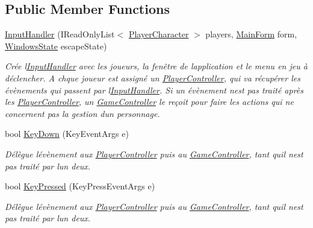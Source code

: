 \subsection*{Public Member Functions}
\begin{DoxyCompactItemize}
\item 
\hyperlink{class_tentacle_slicers_1_1inputs_1_1_input_handler_a7c9bfb4948b863cf8499d5142b622f32}{Input\+Handler} (I\+Read\+Only\+List$<$ \hyperlink{class_tentacle_slicers_1_1actors_1_1_player_character}{Player\+Character} $>$ players, \hyperlink{class_tentacle_slicers_1_1windows_1_1_main_form}{Main\+Form} form, \hyperlink{class_tentacle_slicers_1_1windows_1_1_windows_state}{Windows\+State} escape\+State)
\begin{DoxyCompactList}\small\item\em Crée l\textquotesingle{}\hyperlink{class_tentacle_slicers_1_1inputs_1_1_input_handler}{Input\+Handler} avec les joueurs, la fenêtre de l\textquotesingle{}application et le menu en jeu à déclencher. A chque joueur est assigné un \hyperlink{class_tentacle_slicers_1_1inputs_1_1_player_controller}{Player\+Controller}, qui va récupérer les évènements qui passent par l\textquotesingle{}\hyperlink{class_tentacle_slicers_1_1inputs_1_1_input_handler}{Input\+Handler}. Si un évènement n\textquotesingle{}est pas traité après les \hyperlink{class_tentacle_slicers_1_1inputs_1_1_player_controller}{Player\+Controller}, un \hyperlink{class_tentacle_slicers_1_1inputs_1_1_game_controller}{Game\+Controller} le reçoit pour faire les actions qui ne concernent pas la gestion d\textquotesingle{}un personnage. \end{DoxyCompactList}\item 
bool \hyperlink{class_tentacle_slicers_1_1inputs_1_1_input_handler_a3ac60dd0530cbd2b5e00d34d04f3ffc4}{Key\+Down} (Key\+Event\+Args e)
\begin{DoxyCompactList}\small\item\em Délègue l\textquotesingle{}évènement aux \hyperlink{class_tentacle_slicers_1_1inputs_1_1_player_controller}{Player\+Controller} puis au \hyperlink{class_tentacle_slicers_1_1inputs_1_1_game_controller}{Game\+Controller}, tant qu\textquotesingle{}il n\textquotesingle{}est pas traité par l\textquotesingle{}un d\textquotesingle{}eux. \end{DoxyCompactList}\item 
bool \hyperlink{class_tentacle_slicers_1_1inputs_1_1_input_handler_a45c9b57b11c327fbf21e7927fedac068}{Key\+Pressed} (Key\+Press\+Event\+Args e)
\begin{DoxyCompactList}\small\item\em Délègue l\textquotesingle{}évènement aux \hyperlink{class_tentacle_slicers_1_1inputs_1_1_player_controller}{Player\+Controller} puis au \hyperlink{class_tentacle_slicers_1_1inputs_1_1_game_controller}{Game\+Controller}, tant qu\textquotesingle{}il n\textquotesingle{}est pas traité par l\textquotesingle{}un d\textquotesingle{}eux. \end{DoxyCompactList}\item 

\end{DoxyCompactItemize}
